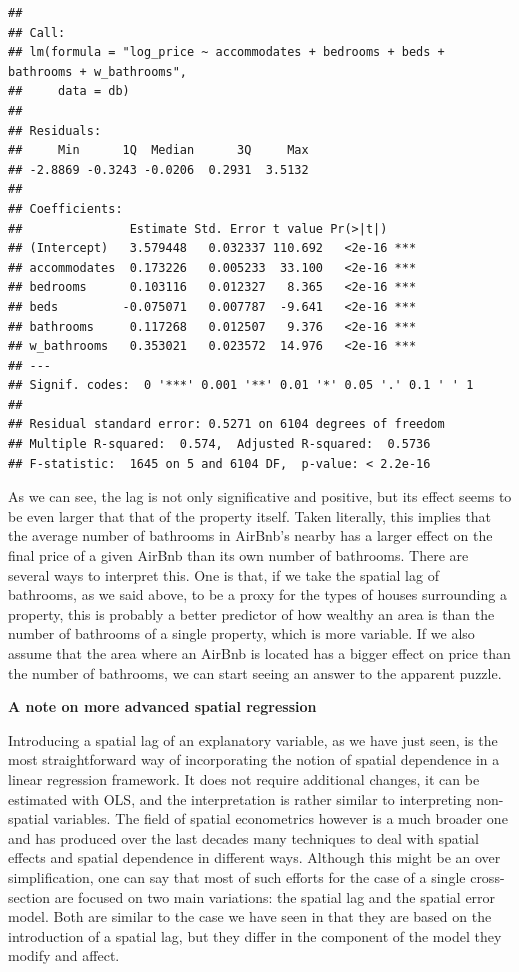 \documentclass[
]{book}
\begin{document}
\begin{verbatim}
## 
## Call:
## lm(formula = "log_price ~ accommodates + bedrooms + beds + bathrooms + w_bathrooms", 
##     data = db)
## 
## Residuals:
##     Min      1Q  Median      3Q     Max 
## -2.8869 -0.3243 -0.0206  0.2931  3.5132 
## 
## Coefficients:
##               Estimate Std. Error t value Pr(>|t|)    
## (Intercept)   3.579448   0.032337 110.692   <2e-16 ***
## accommodates  0.173226   0.005233  33.100   <2e-16 ***
## bedrooms      0.103116   0.012327   8.365   <2e-16 ***
## beds         -0.075071   0.007787  -9.641   <2e-16 ***
## bathrooms     0.117268   0.012507   9.376   <2e-16 ***
## w_bathrooms   0.353021   0.023572  14.976   <2e-16 ***
## ---
## Signif. codes:  0 '***' 0.001 '**' 0.01 '*' 0.05 '.' 0.1 ' ' 1
## 
## Residual standard error: 0.5271 on 6104 degrees of freedom
## Multiple R-squared:  0.574,  Adjusted R-squared:  0.5736 
## F-statistic:  1645 on 5 and 6104 DF,  p-value: < 2.2e-16
\end{verbatim}

As we can see, the lag is not only significative and positive, but its effect seems to be even larger that that of the property itself. Taken literally, this implies that the average number of bathrooms in AirBnb's nearby has a larger effect on the final price of a given AirBnb than its own number of bathrooms. There are several ways to interpret this. One is that, if we take the spatial lag of bathrooms, as we said above, to be a proxy for the types of houses surrounding a property, this is probably a better predictor of how wealthy an area is than the number of bathrooms of a single property, which is more variable. If we also assume that the area where an AirBnb is located has a bigger effect on price than the number of bathrooms, we can start seeing an answer to the apparent puzzle.

\textbf{A note on more advanced spatial regression}

Introducing a spatial lag of an explanatory variable, as we have just seen, is the most straightforward way of incorporating the notion of spatial dependence in a linear regression framework. It does not require additional changes, it can be estimated with OLS, and the interpretation is rather similar to interpreting non-spatial variables. The field of spatial econometrics however is a much broader one and has produced over the last decades many techniques to deal with spatial effects and spatial dependence in different ways. Although this might be an over simplification, one can say that most of such efforts for the case of a single cross-section are focused on two main variations: the spatial lag and the spatial error model. Both are similar to the case we have seen in that they are based on the introduction of a spatial lag, but they differ in the component of the model they modify and affect.
\end{document}
